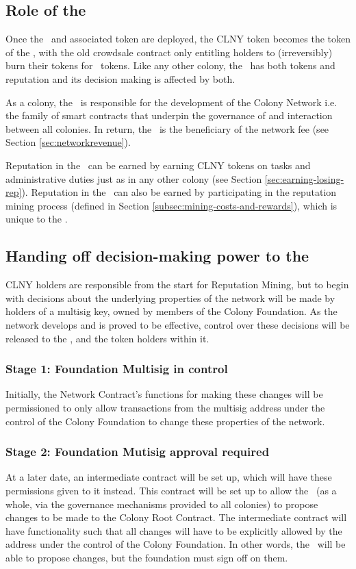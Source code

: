 \subsection{Role of the \rc}
Once the \rc\ and associated token are deployed, the CLNY token becomes the token of the \rc, with the old crowdsale contract only entitling holders to (irreversibly) burn their tokens for \rc\ tokens. Like any other colony, the \rc\ has both tokens and reputation and its decision making is affected by both.

As a colony, the \rc\ is responsible for the development of the Colony Network i.e. the family of smart contracts that underpin the governance of and interaction between all colonies. In return, the \rc\ is the beneficiary of the network fee (see Section \ref{sec:networkrevenue}).

Reputation in the \rc\ can be earned by earning CLNY tokens on tasks and administrative duties just as in any other colony (see Section \ref{sec:earning-losing-rep}). Reputation in the \rc\ can also be earned by participating in the reputation mining process (defined in Section \ref{subsec:mining-costs-and-rewards}), which is unique to the \rc.

\subsection{Handing off decision-making power to the \rc}\label{subsec:ceding-control-to-rc}
CLNY holders are responsible from the start for Reputation Mining, but to begin with decisions about the underlying properties of the network will be made by holders of a multisig key, owned by members of the Colony Foundation. As the network develops and is proved to be effective, control over these decisions will be released to the \rc, and the token holders within it.

\subsubsection*{Stage 1: Foundation Multisig in control}
Initially, the Network Contract's functions for making these changes will be permissioned to only allow transactions from the multisig address under the control of the Colony Foundation to change these properties of the network. 

\subsubsection*{Stage 2: Foundation Mutisig approval required}
At a later date, an intermediate contract will be set up, which will have these permissions given to it instead. This contract will be set up to allow the \rc\ (as a whole, via the governance mechanisms provided to all colonies) to propose changes to be made to the Colony Root Contract. The intermediate contract will have functionality such that all changes will have to be explicitly allowed by the address under the control of the Colony Foundation. In other words, the \rc\ will be able to propose changes, but the foundation must sign off on them.


